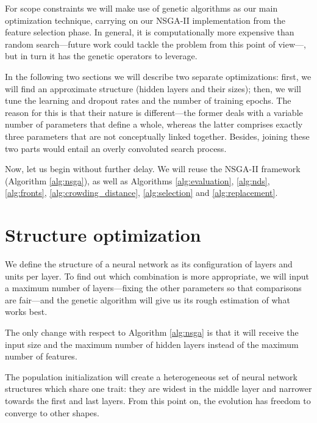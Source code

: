 For scope constraints we will make use of genetic algorithms as our main optimization technique, carrying on our \acs{NSGA-II} implementation from the feature selection phase. In general, it is computationally more expensive than random search---future work could tackle the problem from this point of view---, but in turn it has the genetic operators to leverage.

In the following two sections we will describe two separate optimizations: first, we will find an approximate structure (hidden layers and their sizes); then, we will tune the learning and dropout rates and the number of training epochs. The reason for this is that their nature is different---the former deals with a variable number of parameters that define a whole, whereas the latter comprises exactly three parameters that are not conceptually linked together. Besides, joining these two parts would entail an overly convoluted search process.

Now, let us begin without further delay. We will reuse the \acs{NSGA-II} framework (Algorithm \ref{alg:nsga}), as well as Algorithms \ref{alg:evaluation}, \ref{alg:nds}, \ref{alg:fronts}, \ref{alg:crowding_distance}, \ref{alg:selection} and \ref{alg:replacement}.

\section{Structure optimization}\label{sec:structure_optimization}

	We define the structure of a neural network as its configuration of layers and units per layer. To find out which combination is more appropriate, we will input a maximum number of layers---fixing the other parameters so that comparisons are fair---and the genetic algorithm will give us its rough estimation of what works best.

	The only change with respect to Algorithm \ref{alg:nsga} is that it will receive the input size and the maximum number of hidden layers instead of the maximum number of features.

	The population initialization will create a heterogeneous set of neural network structures which share one trait: they are widest in the middle layer and narrower towards the first and last layers. From this point on, the evolution has freedom to converge to other shapes.

	\vspace{0.3cm}

